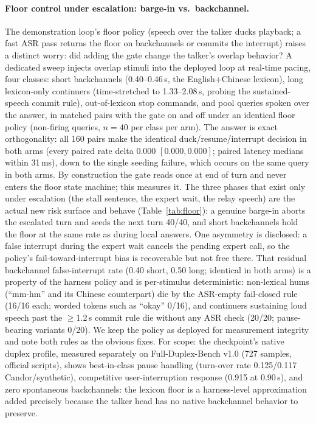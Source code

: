 \paragraph{Floor control under escalation: barge-in vs.\ backchannel.}
The demonstration loop's floor policy (speech over the talker ducks
playback; a fast ASR pass returns the floor on backchannels or commits
the interrupt) raises a distinct worry: did adding the gate change the
talker's overlap behavior? A dedicated sweep injects overlap stimuli
into the deployed loop at real-time pacing, four classes: short
backchannels (0.40--0.46\,s, the English+Chinese lexicon), long
lexicon-only continuers (time-stretched to 1.33--2.08\,s, probing the
sustained-speech commit rule), out-of-lexicon stop commands, and pool
queries spoken over the answer, in matched pairs with the gate on
and off under an identical floor policy (non-firing queries, $n{=}40$
per class per arm). The answer is exact orthogonality: all 160 pairs
make the identical duck/resume/interrupt decision in both arms (every
paired rate delta $0.000$ $[0.000,0.000]$; paired latency medians
within 31\,ms), down to the single seeding failure, which occurs on
the same query in both arms. By construction the gate reads once at
end of turn and never enters the floor state machine; this measures
it. The three phases that exist only under escalation (the stall
sentence, the expert wait, the relay speech) are the actual new
risk surface and behave (Table~\ref{tab:floor}): a genuine barge-in
aborts the escalated turn and seeds the next turn 40/40, and short
backchannels hold the floor at the same rate as during local answers.
One asymmetry is disclosed: a false interrupt during the expert wait
cancels the pending expert call, so the policy's fail-toward-interrupt
bias is recoverable but not free there. That residual backchannel
false-interrupt rate (0.40 short, 0.50 long; identical in both arms)
is a property of the harness policy and is per-stimulus deterministic:
non-lexical hums (``mm-hm'' and its Chinese counterpart) die by the
ASR-empty fail-closed rule (16/16 each; worded tokens such as
``okay'' 0/16), and continuers sustaining loud speech past the
$\ge$1.2\,s commit rule die without any ASR check (20/20;
pause-bearing variants 0/20). We keep the policy as deployed for
measurement integrity and note both rules as the obvious fixes. For
scope: the checkpoint's native duplex profile, measured
separately on Full-Duplex-Bench v1.0 \citep{lin2025fdb} (727 samples,
official scripts), shows best-in-class pause handling (turn-over rate
0.125/0.117 Candor/synthetic), competitive user-interruption response
(0.915 at 0.90\,s), and zero spontaneous backchannels: the
lexicon floor is a harness-level approximation added precisely because
the talker head has no native backchannel behavior to preserve.

